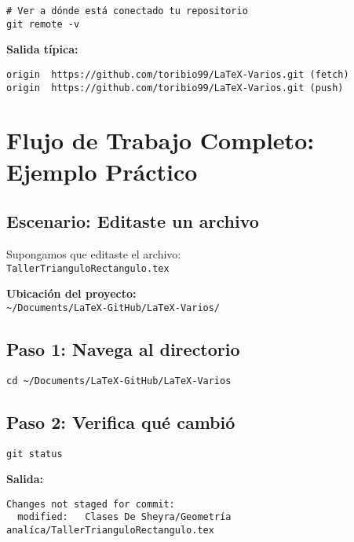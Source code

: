 \documentclass[11pt,a4paper]{article}
\begin{document}
\begin{lstlisting}[style=bashstyle]
# Ver a dónde está conectado tu repositorio
git remote -v
\end{lstlisting}

\textbf{Salida típica:}
\begin{lstlisting}[style=bashstyle]
origin  https://github.com/toribio99/LaTeX-Varios.git (fetch)
origin  https://github.com/toribio99/LaTeX-Varios.git (push)
\end{lstlisting}

\section{Flujo de Trabajo Completo: Ejemplo Práctico}

\subsection{Escenario: Editaste un archivo}

Supongamos que editaste el archivo:\\
\texttt{TallerTrianguloRectangulo.tex}

\textbf{Ubicación del proyecto:}\\
\texttt{\textasciitilde/Documents/LaTeX-GitHub/LaTeX-Varios/}

\subsection{Paso 1: Navega al directorio}

\begin{lstlisting}[style=bashstyle]
cd ~/Documents/LaTeX-GitHub/LaTeX-Varios
\end{lstlisting}

\subsection{Paso 2: Verifica qué cambió}

\begin{lstlisting}[style=bashstyle]
git status
\end{lstlisting}

\textbf{Salida:}
\begin{lstlisting}[style=bashstyle]
Changes not staged for commit:
  modified:   Clases De Sheyra/Geometría analíca/TallerTrianguloRectangulo.tex
\end{lstlisting}
\end{document}
